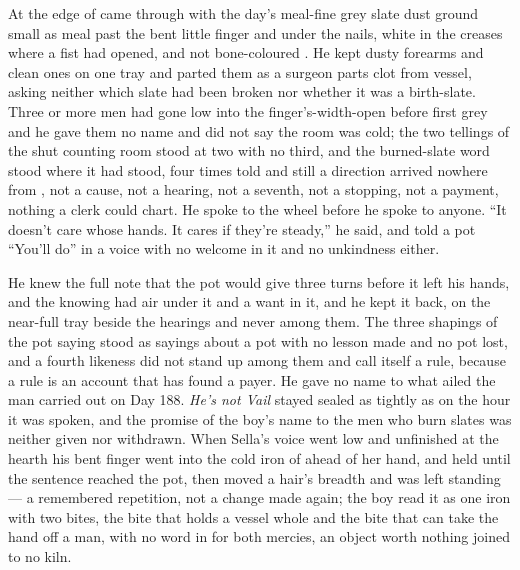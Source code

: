 \scenebreak

At the edge of   came through with the day's meal-fine grey slate dust ground small as meal past the bent little finger and under the nails, white in the creases where a fist had opened, and not bone-coloured . He kept dusty forearms and clean ones on one tray and parted them as a surgeon parts clot from vessel, asking neither which slate had been broken nor whether it was a birth-slate. Three or more men had gone low into the finger's-width-open  before first grey and he gave them no name and did not say the room was cold; the two tellings of the shut counting room stood at two with no third, and the burned-slate word stood where it had stood, four times told and still a direction arrived nowhere from , not a cause, not a hearing, not a seventh, not a stopping, not a payment, nothing a clerk could chart. He spoke to the wheel before he spoke to anyone. “It doesn't care whose hands. It cares if they're steady,” he said, and told a pot “You'll do” in a voice with no welcome in it and no unkindness either.

He knew the full note that the pot would give three turns before it left his hands, and the knowing had air under it and a want in it, and he kept it back, on the near-full tray beside the hearings and never among them. The three shapings of the pot saying stood as sayings about a pot with no lesson made and no pot lost, and a fourth likeness did not stand up among them and call itself a rule, because a rule is an account that has found a payer. He gave no name to what ailed the man carried out on Day 188. \emph{He's not Vail} stayed sealed as tightly as on the hour it was spoken, and the promise of the boy's name to the men who burn slates was neither given nor withdrawn. When Sella's voice went low and unfinished at the hearth his bent finger went into the cold iron of  ahead of her hand, and held until the sentence reached the pot, then moved a hair's breadth and was left standing --- a remembered repetition, not a change made again; the boy read it as one iron with two bites, the bite that holds a vessel whole and the bite that can take the hand off a man, with no word in  for both mercies, an object worth nothing joined to no kiln.

\scenebreak

